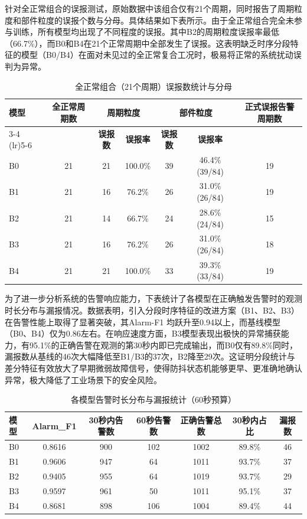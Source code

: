 \documentclass[12pt, a4paper]{ctexart}
\begin{document}
针对全正常组合的误报测试，原始数据中该组合仅有21个周期，同时报告了周期粒度和部件粒度的误报个数与分母。具体结果如下表所示。由于全正常组合完全未参与训练，所有模型均出现了不同程度的误报。其中B2的周期粒度误报率最低（66.7\%），而B0和B4在21个正常周期中全部发生了误报。这表明缺乏时序分段特征的模型（B0/B4）在面对未见过的全正常复合工况时，极易将正常的系统扰动误判为异常。
\begin{table}[H]
    \centering
    \caption{全正常组合（21个周期）误报数统计与分母}
    \label{tab:false_alarm}
    \small
    \setlength{\tabcolsep}{3pt}
    \begin{tabular}{lcccccc}
        \toprule
        \multirow{2}{*}{\textbf{模型}} & \multirow{2}{*}{\textbf{全正常周期数}} & \multicolumn{2}{c}{\textbf{周期粒度}} & \multicolumn{2}{c}{\textbf{部件粒度}} & \multirow{2}{*}{\textbf{正式误报告警周期数}} \\
        \cmidrule(lr){3-4} \cmidrule(lr){5-6}
        & & \textbf{误报数} & \textbf{误报率} & \textbf{误报数} & \textbf{误报率} & \\
        \midrule
        B0 & 21 & 21 & 100.0\% & 39 & 46.4\% (39/84) & 19 \\
        B1 & 21 & 16 & 76.2\%  & 26 & 31.0\% (26/84) & 19 \\
        B2 & 21 & 14 & 66.7\%  & 24 & 28.6\% (24/84) & 15 \\
        B3 & 21 & 16 & 76.2\%  & 26 & 31.0\% (26/84) & 18 \\
        B4 & 21 & 21 & 100.0\% & 33 & 39.3\% (33/84) & 19 \\
        \bottomrule
    \end{tabular}
\end{table}
为了进一步分析系统的告警响应能力，下表统计了各模型在正确触发告警时的观测时长分布与漏报情况。数据表明，引入分段时序特征的改进方案（B1、B2、B3）在告警性能上取得了显著突破，其Alarm-F1 均跃升至0.94以上，而基线模型（B0、B4）仅为0.86左右。在响应速度方面，B3模型表现出极快的异常捕获能力，有95.1\%的正确告警在观测的第30秒内即已完成输出，而B0仅有89.8\%同时，漏报数从基线的46次大幅降低至B1/B3的37次，B2降至29次。这证明分段统计与差分特征有效放大了早期微弱故障信号，使得防抖状态机能够更早、更准确地确认异常，极大降低了工业场景下的安全风险。
\begin{table}[H]
    \centering
    \caption{各模型告警时长分布与漏报统计（60秒预算）}
    \label{tab:alarm_time_dist}
    \small
    \setlength{\tabcolsep}{4pt}
    \begin{tabular}{lcccccc}
        \toprule
        \textbf{模型} & \textbf{Alarm\_F1} & \textbf{30秒内告警数} & \textbf{60秒告警数} & \textbf{正确告警总数} & \textbf{30秒内占比} & \textbf{漏报数} \\
        \midrule
        B0 & 0.8616 & 900 & 102 & 1002 & 89.8\% & 46 \\
        B1 & 0.9606 & 947 &  64 & 1011 & 93.7\% & 37 \\
        B2 & 0.9405 & 955 &  64 & 1019 & 93.7\% & 29 \\
        B3 & 0.9597 & 961 &  50 & 1011 & 95.1\% & 37 \\
        B4 & 0.8681 & 898 & 106 & 1004 & 89.4\% & 44 \\
        \bottomrule
    \end{tabular}
\end{table}
\end{document}
